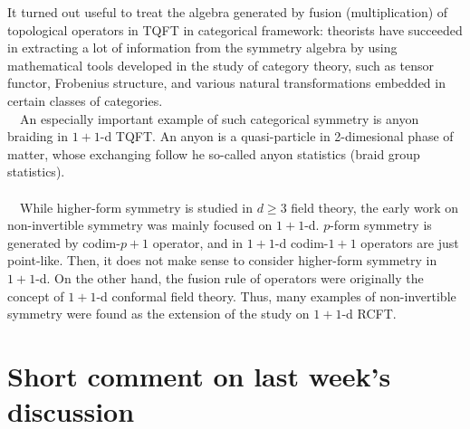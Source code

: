 \documentclass{ltjsarticle}
\theoremstyle{mystyle} %
\numberwithin{equation}{section}
\begin{document}
It turned out useful to treat the algebra generated by fusion (multiplication) of topological operators in TQFT in categorical framework: 
theorists have succeeded in extracting a lot of information from the symmetry algebra by using mathematical tools developed in the study of category theory, 
such as tensor functor, Frobenius structure, and various natural transformations embedded in certain classes of categories. \\
　An especially important example of such categorical symmetry is anyon braiding in $1+1$-d TQFT. 
An anyon is a quasi-particle in 2-dimesional phase of matter, 
whose exchanging follow he so-called anyon statistics (braid group statistics). 
\\
\\
　While higher-form symmetry is studied in $d\geq 3$ field theory, 
the early work on non-invertible symmetry was mainly focused on $1+1$-d. 
$p$-form symmetry is generated by codim-$p+1$ operator, and 
in $1+1$-d codim-$1+1$ operators are just point-like. 
Then, it does not make sense to consider higher-form symmetry in $1+1$-d. 
On the other hand, 
the fusion rule of operators were originally the concept of $1+1$-d conformal field theory. 
Thus, many examples of non-invertible symmetry were found as the extension of the study on $1+1$-d RCFT. 
\newpage
\section{Short comment on last week's discussion}
\end{document}
